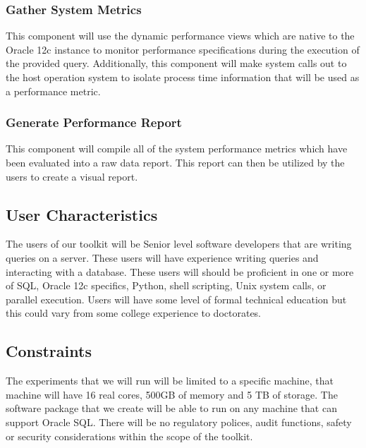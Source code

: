 \documentclass[draftclsnofoot, onecolumn, compsoc, 10pt]{IEEEtran}
\begin{document}
\subsubsection{Gather System Metrics}
This component will use the dynamic performance views which are native to the Oracle 12c instance to monitor performance specifications during the execution of the provided query. 
Additionally, this component will make system calls out to the host operation system to isolate process time information that will be used as a performance metric. 

\subsubsection{Generate Performance Report}
This component will compile all of the system performance metrics which have been evaluated into a raw data report. This report can then be utilized by the users to create a visual report.

\subsection{User Characteristics}
The users of our toolkit will be Senior level software developers that are writing queries on a server.
These users will have experience writing queries and interacting with a database.
These users will should be proficient in one or more of SQL, Oracle 12c specifics, Python, shell scripting, Unix system calls, or parallel execution.
Users will have some level of formal technical education but this could vary from some college experience to doctorates.  

\subsection{Constraints}
The experiments that we will run will be limited to a specific machine, that machine will have 16 real cores, 500GB of memory and 5 TB of storage.
The software package that we create  will be able to run on any machine that can support Oracle SQL.
There will be no regulatory polices, audit functions, safety or security considerations within the scope of the toolkit.
\end{document}
